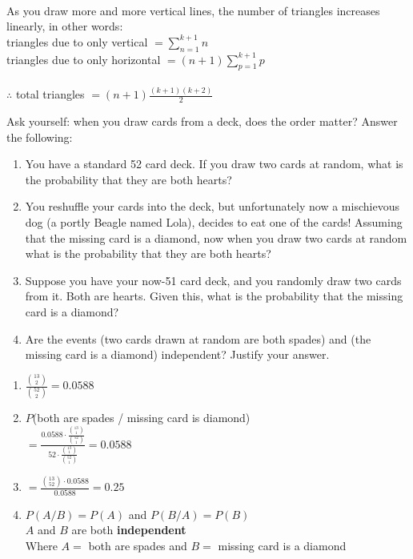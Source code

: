 \documentclass[11pt]{amsart}
\newcommand{\be}{\begin{enumerate}}
\newcommand{\ee}{\end{enumerate}}
\begin{document}
	\begin{sol}
		\\As you draw more and more vertical lines, the number of triangles increases linearly, in other words:\\
		triangles due to only vertical $= \sum^{k+1}_{n=1} n$\\
		triangles due to only horizontal $= (n+1) \sum^{k+1}_{p=1} p$\\
		\\
		$\therefore$ total triangles $= (n+1)\frac{(k+1)(k+2)}{2}$
	\end{sol}
\item Ask yourself: when you draw cards from a deck, does the order matter?  Answer the following:
	\be
	\item You have a standard 52 card deck.  If you draw two cards at random, what is the probability that they are both hearts? 
	
	\item You reshuffle your cards into the deck, but unfortunately now a mischievous dog (a portly Beagle named Lola), decides to eat one of the cards!  Assuming that the missing card is a diamond, now when you draw two cards at random what is the probability that they are both hearts? 
	
	\item Suppose you have your now-51 card deck, and you randomly draw two cards from it.  Both are hearts.  Given this, what is the probability that the missing card is a diamond?
	
	\item Are the events (two cards drawn at random are both spades) and (the missing card is a diamond) independent?  Justify your answer.
	\ee
	\begin{sol}
		\be
			\item $\frac{\binom{13}{2}}{\binom{52}{2}} = \mathbf{0.0588}$

			\item $P$(both are spades / missing card is diamond)\\
			$= \frac{0.0588 \cdot \frac{\binom{13}{1}}{\binom{52}{1}}}{52 \cdot \frac{\binom{13}{1}}{\binom{52}{1}}} = \mathbf{0.0588}$

			\item $= \frac{\binom{13}{52} \cdot 0.0588}{0.0588} = \mathbf{0.25}$

			\item $P(A / B) = P(A)$ and $P(B / A) = P(B)$\\
			$A$ and $B$ are both \textbf{independent}\\
			Where $A =$ both are spades and $B =$ missing card is a diamond
		\ee
	\end{sol}
\end{document}
